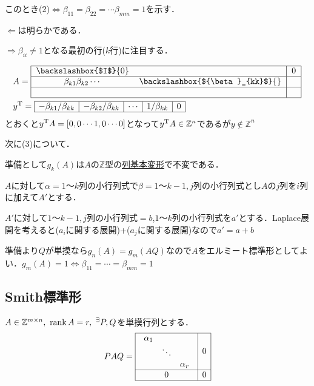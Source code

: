 このとき(2)$\Leftrightarrow{\beta}_{11}={\beta}_{22}=\cdots{\beta}_{mm}=1$を示す．

$\Leftarrow$は明らかである．

$\Rightarrow{\beta}_{ii}\neq 1$となる最初の行($k$行)に注目する．

\begin{align*}
  &A=
  \begin{tabular}{|cc|c|}
    \hline
    \backslashbox{$I$}{0}&&0\\\hline
    ${\beta}_{k1}{\beta}_{k2}\cdots$&\backslashbox{${\beta}_{kk}$}{}&\\\hline
    &&\\\hline
  \end{tabular}\\
  &\transpose{y}=
  \begin{array}{|c|c|c|c|c|}
    \hline
    -{\beta}_{k1}/{\beta}_{kk}&-{\beta}_{k2}/{\beta}_{kk}&\cdots&1/{\beta}_{kk}&0\\\hline
  \end{array}
\end{align*}
とおくと${y}^{\mathrm{T}}A=[0,0\cdots 1,0\cdots 0]$となって${y}^{\mathrm{T}}A\in{\mathbb{Z}}^n$であるが$y\notin{\mathbb{Z}}^n$

次に(3)について．

準備として$g_k (A)$は$A$の$\mathbb{Z}$型の\hyperlink{basictrans}{列基本変形}で不変である．

$A$に対して$\alpha=1～k$列の小行列式で$\beta=1～k-1,j$列の小行列式とし$A$の$j$列を$i$列に加えて$A'$とする．

$A'$に対して$1～k-1,j$列の小行列式$=b$,$1～k$列の小行列式を$a'$とする．Laplace展開を考えると($a_i$に関する展開)+($a_j$に関する展開)なので$a'=a+b$

準備より$Q$が単摸なら$g_n (A)=g_m (AQ)$なので$A$をエルミート標準形としてよい．$g_m (A)=1\Leftrightarrow{\beta}_{11}=\cdots ={\beta}_{mm}=1$
\subsection{Smith標準形}
$A\in{\mathbb{Z}}^{m\times n},\ \rank{A}=r,\ {}^{\exists}P,Q$を単摸行列とする．
\begin{equation}
  PAQ=
  \begin{array}{|c|c|}
    \hline
    \begin{array}{ccc}
      {\alpha}_1&&\\
      &\ddots&\\
      &&{\alpha}_r
    \end{array}&0\\\hline
    0&0\\\hline
  \end{array}
\end{equation}

